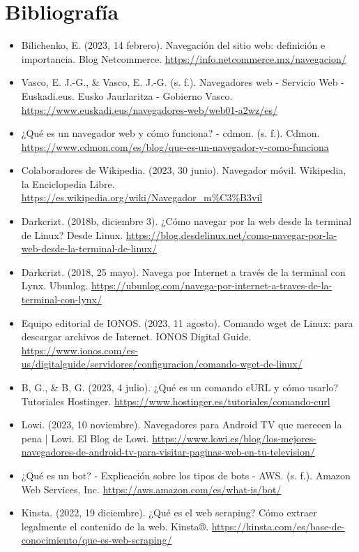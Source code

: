 \documentclass[12pt]{article}
\begin{document}
        \newpage
        \section{Bibliografía}
        \begin{itemize}
                \item Bilichenko, E. (2023, 14 febrero). Navegación del sitio web: definición e importancia. Blog Netcommerce. \url{https://info.netcommerce.mx/navegacion/}
                \item Vasco, E. J.-G., \& Vasco, E. J.-G. (s. f.). Navegadores web - Servicio Web - Euskadi.eus. Eusko Jaurlaritza - Gobierno Vasco. \url{https://www.euskadi.eus/navegadores-web/web01-a2wz/es/}
                \item ¿Qué es un navegador web y cómo funciona? - cdmon. (s. f.). Cdmon. \url{https://www.cdmon.com/es/blog/que-es-un-navegador-y-como-funciona}
                \item Colaboradores de Wikipedia. (2023, 30 junio). Navegador móvil. Wikipedia, la Enciclopedia Libre. \url{https://es.wikipedia.org/wiki/Navegador_m%C3%B3vil}
                \item Darkcrizt. (2018b, diciembre 3). ¿Cómo navegar por la web desde la terminal de Linux? Desde Linux. \url{https://blog.desdelinux.net/como-navegar-por-la-web-desde-la-terminal-de-linux/}
                \item Darkcrizt. (2018, 25 mayo). Navega por Internet a través de la terminal con Lynx. Ubunlog. \url{https://ubunlog.com/navega-por-internet-a-traves-de-la-terminal-con-lynx/}
                \item Equipo editorial de IONOS. (2023, 11 agosto). Comando wget de Linux: para descargar archivos de Internet. IONOS Digital Guide. \url{https://www.ionos.com/es-us/digitalguide/servidores/configuracion/comando-wget-de-linux/}
                \item B, G., \& B, G. (2023, 4 julio). ¿Qué es un comando cURL y cómo usarlo? Tutoriales Hostinger. \url{https://www.hostinger.es/tutoriales/comando-curl}
                \item Lowi. (2023, 10 noviembre). Navegadores para Android TV que merecen la pena | Lowi. El Blog de Lowi. \url{https://www.lowi.es/blog/los-mejores-navegadores-de-android-tv-para-visitar-paginas-web-en-tu-television/}
                \item ¿Qué es un bot? - Explicación sobre los tipos de bots - AWS. (s. f.). Amazon Web Services, Inc. \url{https://aws.amazon.com/es/what-is/bot/}
                \item Kinsta. (2022, 19 diciembre). ¿Qué es el web scraping? Cómo extraer legalmente el contenido de la web. Kinsta®. \url{https://kinsta.com/es/base-de-conocimiento/que-es-web-scraping/}
            \end{itemize}
            
\end{document}
